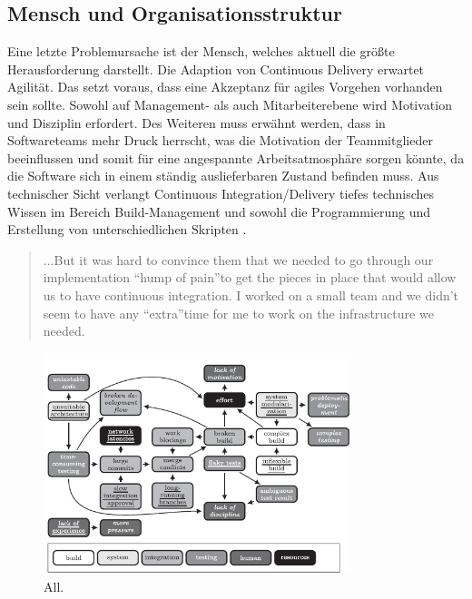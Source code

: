 \subsection{Mensch und Organisationsstruktur}
Eine letzte Problemursache ist der Mensch, welches aktuell die größte Herausforderung darstellt. Die Adaption von Continuous Delivery erwartet Agilität. Das setzt voraus, dass eine Akzeptanz für agiles Vorgehen vorhanden sein sollte. Sowohl auf Management- als auch Mitarbeiterebene wird Motivation und Disziplin erfordert. Des Weiteren muss erwähnt werden, dass in Softwareteams mehr Druck herrscht, was die Motivation der Teammitglieder beeinflussen und somit für eine angespannte Arbeitsatmosphäre sorgen könnte, da die Software sich in einem ständig auslieferbaren Zustand befinden muss. Aus technischer Sicht verlangt Continuous Integration/Delivery tiefes technisches Wissen im Bereich Build-Management und sowohl die Programmierung und Erstellung von unterschiedlichen Skripten \cite{Laukkanen.2017}. 

\begin{quote}\glqq ...But it was hard to convince them that we needed to go through our implementation “hump of pain”to get the pieces in place that would allow us to have continuous integration. I worked on a small team and we didn’t seem to have any “extra”time for me to work on the infrastructure we needed. \grqq~\cite[S.373]{Stolberg.2009}\end{quote}
%

\begin{figure}[ht]
	\centering
	\includegraphics[width=0.8\textwidth,]{images/all}
	\caption{All\cite{Laukkanen.2017}.}
	\label{integrationsprobleme}
\end{figure}